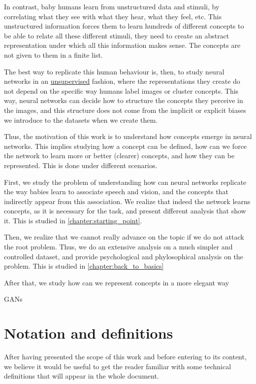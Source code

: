 In contrast, baby humans learn from unstructured data and stimuli, by correlating what they see with what they hear, what they feel, etc. This unstructured information forces them to learn hundreds of different concepts to be able to relate all these different stimuli, they need to create an abstract representation under which all this information makes sense. The concepts are not given to them in a finite list.

The best way to replicate this human behaviour is, then, to study neural networks in an \hyperref[def:supervised]{unsupervised} fashion, where the representations they create do not depend on the specific way humans label images or cluster concepts. This way, neural networks can decide how to structure the concepts they perceive in the images, and this structure does not come from the implicit or explicit biases we introduce to the datasets when we create them.

Thus, the motivation of this work is to understand how concepts emerge in neural networks. This implies studying how a concept can be defined, how can we force the network to learn more or better (clearer) concepts, and how they can be represented. This is done under different scenarios.

First, we study the problem of understanding how can neural networks replicate the way babies learn to associate speech and vision, and the concepts that indirectly appear from this association. We realize that indeed the network learns concepts, as it is necessary for the task, and present different analysis that show it. This is studied in \autoref{chapter:starting_point}.

Then, we realize that we cannot really advance on the topic if we do not attack the root problem. Thus, we do an extensive analysis on a much simpler and controlled dataset, and provide psychological and phylosophical analysis on the problem. This is studied in \autoref{chapter:back_to_basics}

After that, we study how can we represent concepts in a more elegant way

GANs




\newpage
\section{Notation and definitions}
\label{section:notation}

After having presented the scope of this work and before entering to its content, we believe it would be useful to get the reader familiar with some technical definitions that will appear in the whole document. 

